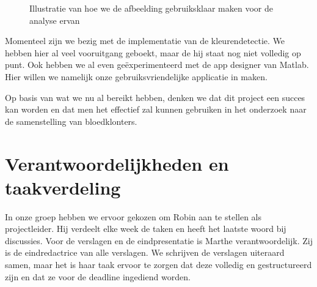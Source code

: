\documentclass[a4paper,kulak]{kulakarticle}
\begin{document}
		\begin{figure}[H]
			\centering
			\qquad
		
			\caption{Illustratie van hoe we de afbeelding gebruiksklaar maken voor de analyse ervan}
			\label{fig: voorna}
		\end{figure}
	
		Momenteel zijn we bezig met de implementatie van de kleurendetectie. We hebben hier al veel vooruitgang geboekt, maar de hij staat nog niet volledig op punt. Ook hebben we al even geëxperimenteerd met de app designer van Matlab. Hier willen we namelijk onze gebruiksvriendelijke applicatie in maken.
	
		Op basis van wat we nu al bereikt hebben, denken we dat dit project een succes kan worden en dat men het effectief zal kunnen gebruiken in het onderzoek naar de samenstelling van bloedklonters.
	
	\section{Verantwoordelijkheden en taakverdeling}		
		In onze groep hebben we ervoor gekozen om Robin aan te stellen als projectleider. Hij verdeelt elke week de taken en heeft het laatste woord bij discussies. 
		Voor de verslagen en de eindpresentatie is Marthe verantwoordelijk. Zij is de eindredactrice van alle verslagen. We schrijven de verslagen uiteraard samen, maar het is haar taak ervoor te zorgen dat deze volledig en gestructureerd zijn en dat ze voor de deadline ingediend worden. 
	
\end{document}
